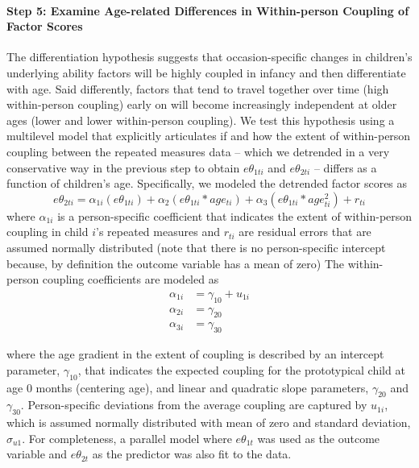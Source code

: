 \documentclass[man, floatsintext]{apa7}
\begin{document}
\paragraph{Step 5: Examine Age-related Differences in Within-person
Coupling of Factor
Scores}
The differentiation hypothesis suggests that occasion-specific changes
in children's underlying ability factors will be highly coupled in
infancy and then differentiate with age. Said differently, factors that
tend to travel together over time (high within-person coupling) early on
will become increasingly independent at older ages (lower and lower
within-person coupling). We test this hypothesis using a multilevel
model that explicitly articulates if and how the extent of within-person
coupling between the repeated measures data -- which we detrended in a
very conservative way in the previous step to obtain $e\theta_{1ti}$
and $e\theta_{2ti}$ -- differs as a function of children's age.
Specifically, we modeled the detrended factor scores as \begin{equation}
e\theta_{2ti} = \alpha_{1i}(e\theta_{1ti}) + \alpha_{2}(e\theta_{1ti} * age_{ti}) + \alpha_{3}(e\theta_{1ti} * age^2_{ti}) + r_{ti}
\end{equation} where $\alpha_{1i}$ is a person-specific coefficient
that indicates the extent of within-person coupling in child $i$'s
repeated measures and $r_{ti}$ are residual errors that are assumed
normally distributed (note that there is no person-specific intercept
because, by definition the outcome variable has a mean of zero) The
within-person coupling coefficients are modeled as 
\begin{align}
\alpha_{1i} &= \gamma_{10} + u_{1i} \\
\alpha_{2i} &= \gamma_{20} \\ 
\alpha_{3i} &= \gamma_{30} 
\end{align} 

\noindent where the age gradient in the extent of coupling is
described by an intercept parameter, $\gamma_{10}$, that indicates the
expected coupling for the prototypical child at age 0 months (centering
age), and linear and quadratic slope parameters, $\gamma_{20}$ and
$\gamma_{30}$. Person-specific deviations from the average coupling
are captured by $u_{1i}$, which is assumed normally distributed with
mean of zero and standard deviation, $\sigma_{u1}$. For completeness,
a parallel model where $e\theta_{1t}$ was used as the outcome variable
and $e\theta_{2t}$ as the predictor was also fit to the data.
\end{document}
